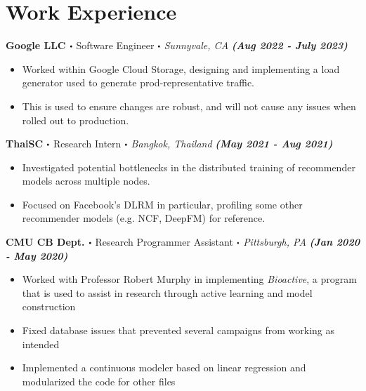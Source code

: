 \documentclass[10pt]{article}
\newcommand\sbullet[1][.5]{\mathbin{\vcenter{\hbox{\scalebox{#1}{$\bullet$}}}}}
\begin{document}
  \section*{\Large \textcolor{lighterB} {Work Experience}}
  \vspace*{-0.23cm}

\textbf{\large Google LLC $\sbullet$} {\large Software Engineer $\sbullet$ \textit{Sunnyvale, CA}} {\hfill \textit{\textbf{(Aug 2022 - July 2023)}}}

  \vspace*{-0.2cm}
  \begin{itemize}
    \itemsep-0.4em
\item \textcolor{lighterG}{Worked within Google Cloud Storage, designing and implementing a load generator used to generate prod-representative traffic.}
    \item \textcolor{lighterG}{This is used to ensure changes are robust, and will not cause any issues when rolled out to production.}
  \end{itemize}

\textbf{\large ThaiSC $\sbullet$} {\large Research Intern $\sbullet$ \textit{Bangkok, Thailand}} {\hfill \textit{\textbf{(May 2021 - Aug 2021)}}}

  \vspace*{-0.2cm}
  \begin{itemize}
    \itemsep-0.4em
    \item \textcolor{lighterG}{Investigated potential bottlenecks in the distributed training of recommender models across multiple nodes.}
    \item \textcolor{lighterG}{Focused on Facebook's DLRM in particular, profiling some other recommender models (e.g. NCF, DeepFM) for reference.}
  \end{itemize}

\textbf{\large CMU CB Dept. $\sbullet$} {\large Research Programmer Assistant $\sbullet$ \textit{Pittsburgh, PA}} {\hfill \textit{\textbf{(Jan 2020 - May 2020)}}}

  \vspace*{-0.2cm}
  \begin{itemize}
    \itemsep-0.4em
    \item \textcolor{lighterG}{Worked with Professor Robert Murphy in implementing \textit{Bioactive}, a program that is used to assist in research through active learning and model construction}
    \item \textcolor{lighterG}{Fixed database issues that prevented several campaigns from working as intended}
    \item \textcolor{lighterG}{Implemented a continuous modeler based on linear regression and modularized the code for other files}
  \end{itemize}
\end{document}
